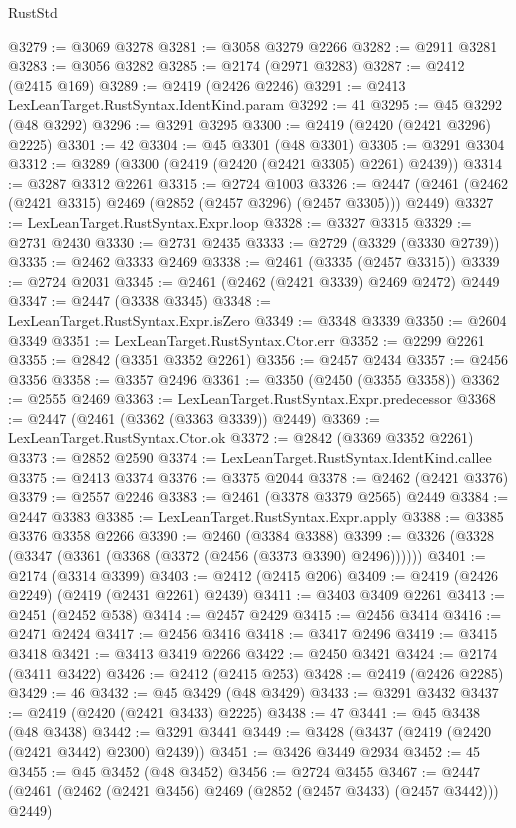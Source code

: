 \begin{lexlean}{RustStd}
\begin{coremodule}
@3279 := @3069 @3278
@3281 := @3058 @3279 @2266
@3282 := @2911 @3281
@3283 := @3056 @3282
@3285 := @2174 (@2971 @3283)
@3287 := @2412 (@2415 @169)
@3289 := @2419 (@2426 @2246)
@3291 := @2413 LexLeanTarget.RustSyntax.IdentKind.param
@3292 := 41
@3295 := @45 @3292 (@48 @3292)
@3296 := @3291 @3295
@3300 := @2419 (@2420 (@2421 @3296) @2225)
@3301 := 42
@3304 := @45 @3301 (@48 @3301)
@3305 := @3291 @3304
@3312 := @3289 (@3300 (@2419 (@2420 (@2421 @3305) @2261) @2439))
@3314 := @3287 @3312 @2261
@3315 := @2724 @1003
@3326 := @2447 (@2461 (@2462 (@2421 @3315) @2469 (@2852 (@2457 @3296) (@2457 @3305))) @2449)
@3327 := LexLeanTarget.RustSyntax.Expr.loop
@3328 := @3327 @3315
@3329 := @2731 @2430
@3330 := @2731 @2435
@3333 := @2729 (@3329 (@3330 @2739))
@3335 := @2462 @3333 @2469
@3338 := @2461 (@3335 (@2457 @3315))
@3339 := @2724 @2031
@3345 := @2461 (@2462 (@2421 @3339) @2469 @2472) @2449
@3347 := @2447 (@3338 @3345)
@3348 := LexLeanTarget.RustSyntax.Expr.isZero
@3349 := @3348 @3339
@3350 := @2604 @3349
@3351 := LexLeanTarget.RustSyntax.Ctor.err
@3352 := @2299 @2261
@3355 := @2842 (@3351 @3352 @2261)
@3356 := @2457 @2434
@3357 := @2456 @3356
@3358 := @3357 @2496
@3361 := @3350 (@2450 (@3355 @3358))
@3362 := @2555 @2469
@3363 := LexLeanTarget.RustSyntax.Expr.predecessor
@3368 := @2447 (@2461 (@3362 (@3363 @3339)) @2449)
@3369 := LexLeanTarget.RustSyntax.Ctor.ok
@3372 := @2842 (@3369 @3352 @2261)
@3373 := @2852 @2590
@3374 := LexLeanTarget.RustSyntax.IdentKind.callee
@3375 := @2413 @3374
@3376 := @3375 @2044
@3378 := @2462 (@2421 @3376)
@3379 := @2557 @2246
@3383 := @2461 (@3378 @3379 @2565) @2449
@3384 := @2447 @3383
@3385 := LexLeanTarget.RustSyntax.Expr.apply
@3388 := @3385 @3376 @3358 @2266
@3390 := @2460 (@3384 @3388)
@3399 := @3326 (@3328 (@3347 (@3361 (@3368 (@3372 (@2456 (@3373 @3390) @2496))))))
@3401 := @2174 (@3314 @3399)
@3403 := @2412 (@2415 @206)
@3409 := @2419 (@2426 @2249) (@2419 (@2431 @2261) @2439)
@3411 := @3403 @3409 @2261
@3413 := @2451 (@2452 @538)
@3414 := @2457 @2429
@3415 := @2456 @3414
@3416 := @2471 @2424
@3417 := @2456 @3416
@3418 := @3417 @2496
@3419 := @3415 @3418
@3421 := @3413 @3419 @2266
@3422 := @2450 @3421
@3424 := @2174 (@3411 @3422)
@3426 := @2412 (@2415 @253)
@3428 := @2419 (@2426 @2285)
@3429 := 46
@3432 := @45 @3429 (@48 @3429)
@3433 := @3291 @3432
@3437 := @2419 (@2420 (@2421 @3433) @2225)
@3438 := 47
@3441 := @45 @3438 (@48 @3438)
@3442 := @3291 @3441
@3449 := @3428 (@3437 (@2419 (@2420 (@2421 @3442) @2300) @2439))
@3451 := @3426 @3449 @2934
@3452 := 45
@3455 := @45 @3452 (@48 @3452)
@3456 := @2724 @3455
@3467 := @2447 (@2461 (@2462 (@2421 @3456) @2469 (@2852 (@2457 @3433) (@2457 @3442))) @2449)

\end{coremodule}
\end{lexlean}

